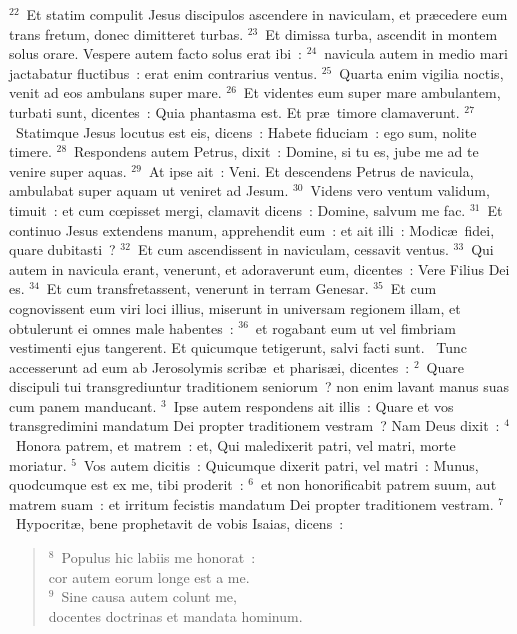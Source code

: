 ${}^{22}$~Et statim compulit Jesus discipulos ascendere in naviculam, et pr\ae cedere eum trans fretum, donec dimitteret turbas.
${}^{23}$~Et dimissa turba, ascendit in montem solus orare. Vespere autem facto solus erat ibi~:
${}^{24}$~navicula autem in medio mari jactabatur fluctibus~: erat enim contrarius ventus.
${}^{25}$~Quarta enim vigilia noctis, venit ad eos ambulans super mare.
${}^{26}$~Et videntes eum super mare ambulantem, turbati sunt, dicentes~: Quia phantasma est. Et pr\ae\ timore clamaverunt.
${}^{27}$~Statimque Jesus locutus est eis, dicens~: Habete fiduciam~: ego sum, nolite timere.
${}^{28}$~Respondens autem Petrus, dixit~: Domine, si tu es, jube me ad te venire super aquas.
${}^{29}$~At ipse ait~: Veni. Et descendens Petrus de navicula, ambulabat super aquam ut veniret ad Jesum.
${}^{30}$~Videns vero ventum validum, timuit~: et cum cœpisset mergi, clamavit dicens~: Domine, salvum me fac.
${}^{31}$~Et continuo Jesus extendens manum, apprehendit eum~: et ait illi~: Modic\ae\ fidei, quare dubitasti~?
${}^{32}$~Et cum ascendissent in naviculam, cessavit ventus.
${}^{33}$~Qui autem in navicula erant, venerunt, et adoraverunt eum, dicentes~: Vere Filius Dei es.
${}^{34}$~Et cum transfretassent, venerunt in terram Genesar.
${}^{35}$~Et cum cognovissent eum viri loci illius, miserunt in universam regionem illam, et obtulerunt ei omnes male habentes~:
${}^{36}$~et rogabant eum ut vel fimbriam vestimenti ejus tangerent. Et quicumque tetigerunt, salvi facti sunt.
~Tunc accesserunt ad eum ab Jerosolymis scrib\ae\ et pharis\ae i, dicentes~:
${}^{2}$~Quare discipuli tui transgrediuntur traditionem seniorum~? non enim lavant manus suas cum panem manducant.
${}^{3}$~Ipse autem respondens ait illis~: Quare et vos transgredimini mandatum Dei propter traditionem vestram~? Nam Deus dixit~:
${}^{4}$~Honora patrem, et matrem~: et, Qui maledixerit patri, vel matri, morte moriatur.
${}^{5}$~Vos autem dicitis~: Quicumque dixerit patri, vel matri~: Munus, quodcumque est ex me, tibi proderit~:
${}^{6}$~et non honorificabit patrem suum, aut matrem suam~: et irritum fecistis mandatum Dei propter traditionem vestram.
${}^{7}$~Hypocrit\ae , bene prophetavit de vobis Isaias, dicens~:
\begin{flushleft}\begin{verse}${}^{8}$~Populus hic labiis me honorat~:\\ cor autem eorum longe est a me.\\
${}^{9}$~Sine causa autem colunt me,\\ docentes doctrinas et mandata hominum.\end{verse}\end{flushleft}


